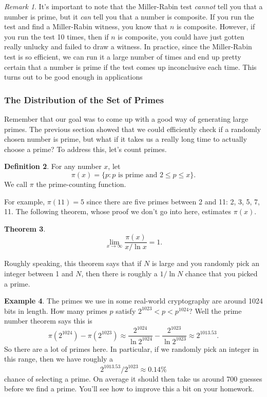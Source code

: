 \documentclass[12pt]{article}
\theoremstyle{plain}
\newtheorem{theorem}{Theorem}[section]
\theoremstyle{definition}
\newtheorem{definition}[theorem]{Definition}
\newtheorem{example}[theorem]{Example}
\theoremstyle{remark}
\newtheorem{remark}[theorem]{Remark}
\begin{document}
\begin{remark}
    It's important to note that the Miller-Rabin test \emph{cannot} tell you that a number is prime, but it \emph{can} tell you that a number is composite.
    If you run the test and find a Miller-Rabin witness, you know that $n$ is composite.
    However, if you run the test 10 times, then if $n$ is composite, you could have just gotten really unlucky and failed to draw a witness.
    In practice, since the Miller-Rabin test is so efficient, we can run it a large number of times and end up pretty certain that a number is prime if the test comes up inconclusive each time.
    This turns out to be good enough in applications
\end{remark}

\subsubsection{The Distribution of the Set of Primes}
Remember that our goal was to come up with a good way of generating large primes.
The previous section showed that we could efficiently check if a randomly chosen number is prime, but what if it takes us a really long time to actually choose a prime?
To address this, let's count primes.

\begin{definition}
    For any number $x$, let
    \[
        \pi(x) = \{p:p\text{ is prime and } 2\leq p\leq x \}.
    \]
    We call $\pi$ the prime-counting function.
\end{definition}

For example, $\pi(11) = 5$ since there are five primes between 2 and 11: 2, 3, 5, 7, 11.
The following theorem, whose proof we don't go into here, estimates $\pi(x)$.
\begin{theorem}\label{The Prime Number Theorem}
    \[
        \lim_{x\to \infty}\frac{\pi(x)}{x/\ln x} = 1.
    \]
\end{theorem}
Roughly speaking, this theorem says that if $N$ is large and you randomly pick an integer between 1 and $N$, then there is roughly a $1/\ln N$ chance that you picked a prime.
\begin{example}
    The primes we use in some real-world cryptography are around 1024 bits in length.
    How many primes $p$ satisfy $2^{1023} < p < p^{1024}$?
    Well the prime number theorem says this is
    \[
        \pi(2^{1024}) - \pi(2^{1023}) \approx \frac{2^{1024}}{\ln 2^{1024}} - \frac{2^{1023}}{\ln 2^{1023}} \approx 2^{1013.53}.
    \]
    So there are a lot of primes here.
    In particular, if we randomly pick an integer in this range, then we have roughly a
    \[
        2^{1013.53}/2^{1023} \approx 0.14\%
    \]
    chance of selecting a prime.
    On average it should then take us around 700 guesses before we find a prime.
    You'll see how to improve this a bit on your homework.
\end{example}
\end{document}
